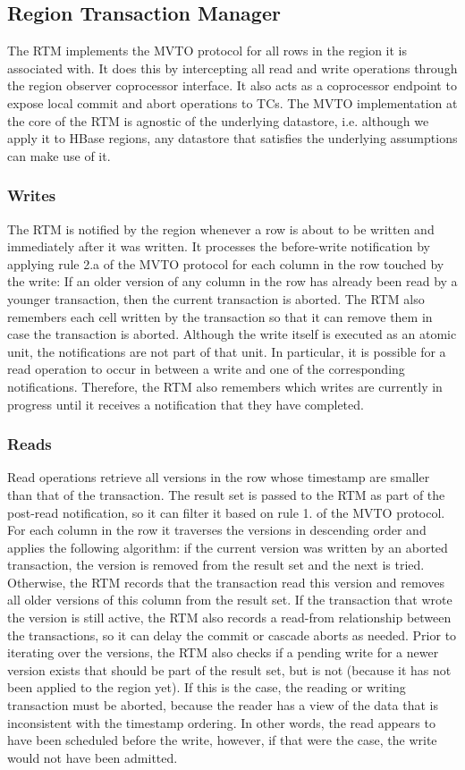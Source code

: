 \documentclass[10pt,final,journal]{IEEEtran}
\begin{document}
\subsection{Region Transaction Manager}
The RTM implements the MVTO protocol for all rows in the region it is associated with. It does this by intercepting all read and write operations through the region observer coprocessor interface. It also acts as a coprocessor endpoint to expose local commit and abort operations to TCs. The MVTO implementation at the core of the RTM is agnostic of the underlying datastore, i.e. although we apply it to HBase regions, any datastore that satisfies the underlying assumptions can make use of it.

\subsubsection{Writes}
The RTM is notified by the region whenever a row is about to be written and immediately after it was written. It processes the before-write notification by applying rule 2.a of the MVTO protocol for each column in the row touched by the write: If an older version of any column in the row has already been read by a younger transaction, then the current transaction is aborted. The RTM also remembers each cell written by the transaction so that it can remove them in case the transaction is aborted. Although the write itself is executed as an atomic unit, the notifications are not part of that unit. In particular, it is possible for a read operation to occur in between a write and one of the corresponding notifications. Therefore, the RTM also remembers which writes are currently in progress until it receives a notification that they have completed.

\subsubsection{Reads}
Read operations retrieve all versions in the row whose timestamp are smaller than that of the transaction. The result set is passed to the RTM as part of the post-read notification, so it can filter it based on rule 1. of the MVTO protocol. For each column in the row it traverses the versions in descending order and applies the following algorithm: if the current version was written by an aborted transaction, the version is removed from the result set and the next is tried. Otherwise, the RTM records that the transaction read this version and removes all older versions of this column from the result set. If the transaction that wrote the version is still active, the RTM also records a read-from relationship between the transactions, so it can delay the commit or cascade aborts as needed. Prior to iterating over the versions, the RTM also checks if a pending write for a newer version exists that should be part of the result set, but is not (because it has not been applied to the region yet). If this is the case, the reading or writing transaction must be aborted, because the reader has a view of the data that is inconsistent with the timestamp ordering. In other words, the read appears to have been scheduled before the write, however, if that were the case, the write would not have been admitted.
\end{document}
